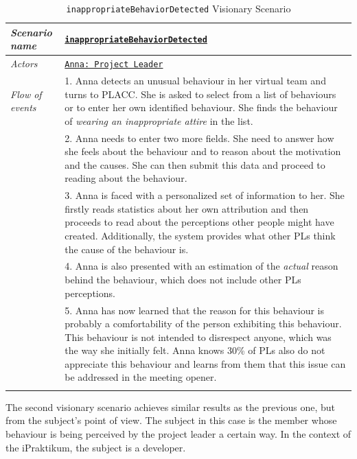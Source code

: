 \begin{longtable}[ht]{ p{}  p{} }
\caption{\texttt{inappropriateBehaviorDetected} Visionary Scenario}
\label{tab:firstVisionaryScenario}\\
\hline
\textit{Scenario name} & \underline{\texttt{inappropriateBehaviorDetected}} \\ [1.2ex]
    \hline
   \textit{Actors} & \underline{\texttt{Anna: Project Leader}}  \\ [1.2ex]
   \hline
   \textit{Flow of events } &  1. Anna detects an unusual behaviour in her virtual team and turns to PLACC. She is asked to select from a list of behaviours or to enter her own identified behaviour. She finds the behaviour of \textit{wearing an inappropriate attire} in the list. \\
   & 2. Anna needs to enter two more fields. She need to answer how she feels about the behaviour and to reason about the motivation and the causes. She can then submit this data and proceed to reading about the behaviour. \\
   & 3. Anna is faced with a personalized set of information to her. She firstly reads statistics about her own attribution and then proceeds to read about the perceptions other people might have created.  Additionally, the system provides what other PLs think the cause of the behaviour is. \\
   & 4. Anna is also presented with an estimation of the \textit{actual} reason behind the behaviour, which does not include other PLs perceptions. \\
   & 5. Anna has now learned that the reason for this behaviour is probably a comfortability of the person exhibiting this behaviour. This behaviour is not intended to disrespect anyone, which was the way she initially felt. Anna knows 30\% of PLs also do not appreciate this behaviour and learns from them that this issue can be addressed in the meeting opener. \\
   \hline
\label{tab:multicol}
\end{longtable}

The second visionary scenario achieves similar results as the previous one,  but from the subject's point of view. The subject in this case is the member whose behaviour is being perceived by the project leader a certain way. In the context of the iPraktikum, the subject is a developer. 

